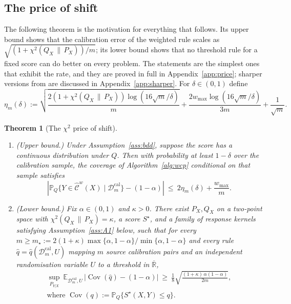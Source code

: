 \documentclass[11pt,a4paper]{article}
\newcommand{\PX}{P_X}
\newcommand{\QX}{Q_X}
\newcommand{\chisq}{\chi^2(\QX\,\|\,\PX)}
\newcommand{\abs}[1]{\left|#1\right|}
\newcommand{\Cov}{\operatorname{Cov}}
\newcommand{\E}{\mathbb{E}}
\newcommand{\Prob}{\mathbb{P}}
\newcommand{\Rbar}{\overline{\mathbb{R}}}
\newcommand{\Cset}{\widehat{\mathcal C}}
\theoremstyle{plain}
\newtheorem{theorem}{Theorem}[section]
\theoremstyle{definition}
\theoremstyle{remark}
\begin{document}
\subsection{The price of shift}

The following theorem is the motivation for everything that follows. Its upper bound shows that the calibration error of the weighted rule scales as $\sqrt{(1+\chisq)/m}$; its lower bound shows that no threshold rule for a fixed score can do better on every problem. The statements are the simplest ones that exhibit the rate, and they are proved in full in Appendix~\ref{app:price}; sharper versions from \cite{isaev2026,pournaderi2026} are discussed in Appendix~\ref{app:sharper}. For $\delta\in(0,1)$ define
\begin{equation}\label{eq:eta}
\eta_m(\delta):=\sqrt{\frac{2(1+\chisq)\log(16\sqrt m/\delta)}{m}}+\frac{2w_{\max}\log(16\sqrt m/\delta)}{3m}+\frac1{\sqrt m}.
\end{equation}

\begin{theorem}[The $\chi^2$ price of shift]\label{thm:price}
\begin{enumerate}[leftmargin=1.8em,itemsep=2pt]
\item[(a)] (Upper bound.) Under Assumption~\ref{ass:bdd}, suppose the score has a continuous distribution under $Q$. Then with probability at least $1-\delta$ over the calibration sample, the coverage of Algorithm~\ref{alg:wcp} conditional on that sample satisfies
\[
\abs{\Prob_Q\{Y\in\Cset^w(X)\mid\mathcal D^{\mathrm{cal}}_m\}-(1-\alpha)}\ \le\ 2\eta_m(\delta)+\frac{w_{\max}}{m}.
\]
\item[(b)] (Lower bound.) Fix $\alpha\in(0,1)$ and $\kappa>0$. There exist $\PX,\QX$ on a two-point space with $\chisq=\kappa$, a score $S^\star$, and a family of response kernels satisfying Assumption~\ref{ass:A1} below, such that for every $m\ge m_\star:=2(1+\kappa)\max\{\alpha,1-\alpha\}/\min\{\alpha,1-\alpha\}$ and every rule $\widehat q=\widehat q(\mathcal D^{\mathrm{cal}}_m,U)$ mapping $m$ source calibration pairs and an independent randomisation variable $U$ to a threshold in $\Rbar$,
\begin{gather*}
\sup_{P_{Y|X}}\ \E_{\mathcal D^{\mathrm{cal}}_m,U}\,\abs{\Cov(\widehat q)-(1-\alpha)}\ \ge\ \frac18\sqrt{\frac{(1+\kappa)\,\alpha(1-\alpha)}{2m}},\\
\text{where }\Cov(q):=\Prob_Q\{S^\star(X,Y)\le q\}.
\end{gather*}
\end{enumerate}
\end{theorem}
\end{document}
